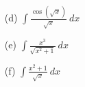 \documentclass[12pt]{article}
\newcommand{\ds}{\displaystyle}
\begin{document}
\begin{enumerate}
\begin{multicols}{3}
	\begin{enumerate}
	\item[(d)] $\ds{\int \frac{\cos( \sqrt{x})}{\sqrt{x}} \: dx}$
	\item[(e)] $\ds{\int \frac{x^3}{\sqrt{x^2+1}} \: dx}$
	\item[(f)] $\ds{\int \frac{x^2+1}{\sqrt{x}} \: dx}$
	\end{enumerate}
\end{multicols}
\vfill

\end{enumerate}
\end{document}
